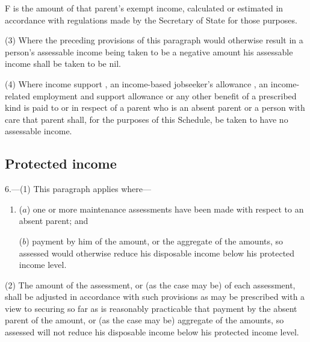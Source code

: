 \documentclass[12pt,a4paper]{article}
\begin{document}
{\begin{enumerate}
F is the amount of that parent’s exempt income, calculated or estimated in accordance with regulations made by the Secretary of State for those purposes.
\end{enumerate}

(3) Where the preceding provisions of this paragraph would otherwise result in a person’s assessable income being taken to be a negative amount his assessable income shall be taken to be nil.

(4) Where income support%
, an income-based jobseeker’s allowance%
, an income-related employment and support allowance
 or any other benefit of a prescribed kind is paid to or in respect of a parent who is an absent parent or a person with care that parent shall, for the purposes of this Schedule, be taken to have no assessable income.


\subsection*{Protected income}

6.---(1) This paragraph applies where---
\begin{enumerate}\item[]
($a$) one or more maintenance assessments have been made with respect to an absent parent; and

($b$) payment by him of the amount, or the aggregate of the amounts, so assessed would otherwise reduce his disposable income below his protected income level.
\end{enumerate}

(2) The amount of the assessment, or (as the case may be) of each assessment, shall be adjusted in accordance with such provisions as may be prescribed with a view to securing so far as is reasonably practicable that payment by the absent parent of the amount, or (as the case may be) aggregate of the amounts, so assessed will not reduce his disposable income below his protected income level.

}
\end{document}
